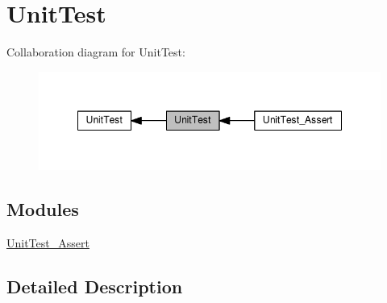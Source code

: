 \hypertarget{group__unit_test}{}\section{Unit\+Test}
\label{group__unit_test}
Collaboration diagram for Unit\+Test\+:\nopagebreak
\begin{figure}[H]
\begin{center}
\leavevmode
\includegraphics[width=348pt]{d8/dbd/group__unit_test}
\end{center}
\end{figure}
\subsection*{Modules}
\begin{DoxyCompactItemize}
\item 
\hyperlink{group__unit_test___assert}{Unit\+Test\+\_\+\+Assert}
\end{DoxyCompactItemize}


\subsection{Detailed Description}
